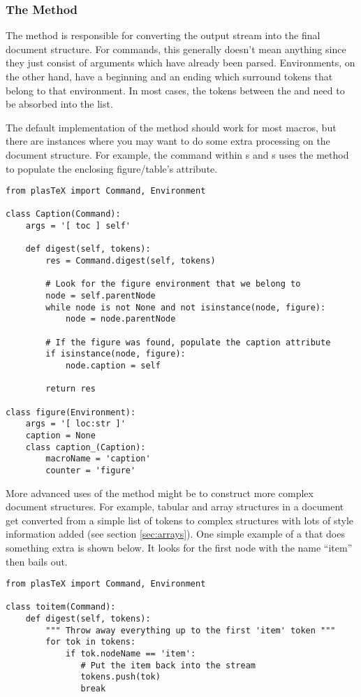 \subsubsection{The  Method}

The  method is responsible for converting the output
stream into the final document structure.  For commands, this generally
doesn't mean anything since they just consist of arguments which 
have already been parsed.  Environments, on the other hand, have a 
beginning and an ending which surround tokens that belong to that
environment.  In most cases, the tokens between the 
and  need to be absorbed into the 
list.

The default implementation of the  method should work
for most macros, but there are instances where you may want to 
do some extra processing on the document structure.  For example,
the  command within s and 
s uses the  method to populate
the enclosing figure/table's  attribute.
\begin{verbatim}
from plasTeX import Command, Environment

class Caption(Command):
    args = '[ toc ] self'

    def digest(self, tokens):
        res = Command.digest(self, tokens)

        # Look for the figure environment that we belong to 
        node = self.parentNode
        while node is not None and not isinstance(node, figure):
            node = node.parentNode

        # If the figure was found, populate the caption attribute
        if isinstance(node, figure):
            node.caption = self

        return res

class figure(Environment):
    args = '[ loc:str ]'
    caption = None
    class caption_(Caption):
        macroName = 'caption'
        counter = 'figure'
\end{verbatim}

More advanced uses of the  method might be to construct
more complex document structures.  For example, tabular and array
structures in a document get converted from a simple list of tokens
to complex structures with lots of style information added (see section
\ref{sec:arrays}).  One simple example of a  that 
does something extra is shown below.  It looks for the first 
node with the name ``item'' then bails out.
\begin{verbatim}
from plasTeX import Command, Environment

class toitem(Command):
    def digest(self, tokens):
        """ Throw away everything up to the first 'item' token """
        for tok in tokens:
            if tok.nodeName == 'item':
               # Put the item back into the stream
               tokens.push(tok)
               break
\end{verbatim}

